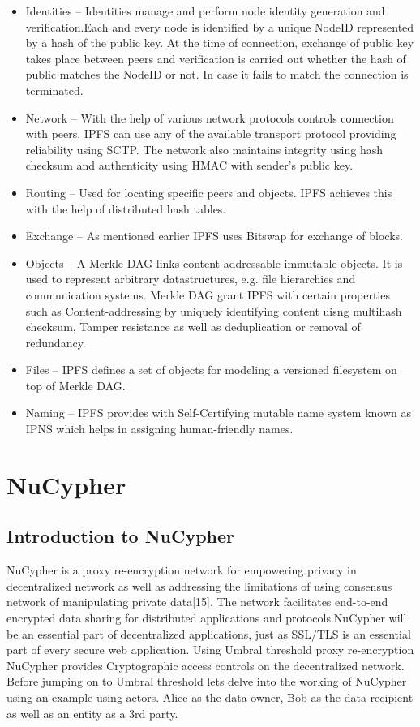 \documentclass[12pt]{article}
\begin{document}
\begin{itemize}


    \item Identities – Identities manage and perform node identity generation and verification.Each and every node is identified by a unique NodeID represented by a hash of the public key. At the time of connection, exchange of public key takes place between peers and verification is carried out whether the hash of public matches the NodeID or not. In case it fails to match the connection is terminated. 
    \item Network – With the help of various network protocols controls connection with peers. IPFS can use any of the available transport protocol providing reliability using SCTP. The network also maintains integrity using hash checksum and authenticity using HMAC with sender’s public key. 
    \item Routing – Used for locating specific peers and objects. IPFS achieves this with the help of distributed hash tables.
    \item Exchange – As mentioned earlier IPFS uses Bitswap  for exchange of blocks. 
    \item Objects – A Merkle DAG links content-addressable immutable objects. It is used to represent arbitrary datastructures, e.g. file hierarchies and communication systems. Merkle DAG grant IPFS with certain properties such as Content-addressing by uniquely identifying content uisng multihash checksum, Tamper resistance as well as deduplication or removal of redundancy.
    \item Files – IPFS defines a set of objects for modeling a versioned filesystem on top of Merkle DAG.
    \item Naming – IPFS provides with Self-Certifying mutable name system known as IPNS which helps in assigning human-friendly names.

\end{itemize}

\section{NuCypher}

\subsection{Introduction to NuCypher}
NuCypher is a proxy re-encryption network for empowering privacy in decentralized network as well as addressing the limitations of using consensus network of manipulating private data[15]. The network facilitates end-to-end encrypted data sharing for distributed applications and protocols.NuCypher will be an essential part of decentralized applications, just as SSL/TLS is an essential part of every secure web application. Using Umbral threshold proxy re-encryption NuCypher provides Cryptographic access controls on the decentralized network. Before jumping on to Umbral threshold lets delve into the working of NuCypher using an example using actors. Alice as the data owner, Bob as the data recipient as well as an entity as a 3rd party.
\end{document}
